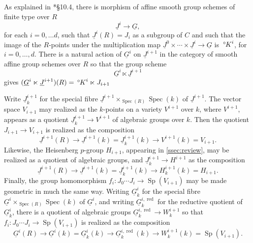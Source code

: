 \documentclass[10pt]{amsart}
\makeatletter
\theoremstyle{plain}
\theoremstyle{definition}
\newcommand{\Fq}{k}
\newcommand{\Spec}[1]{{\operatorname{Spec}(#1)}}
\newcommand{\labitem}[2]{
\def\@itemlabel{\textbf{#1}}
\item
\def\@currentlabel{#1}\label{#2}}
\newcommand{\Sp}{{\operatorname{Sp}}}
\newcommand{\oK}{{\,^\circ \hskip-1pt K}}
\makeatother
\begin{document}
As explained in \cite{Yu:models}*{\S 10.4}, there is morphism of affine smooth group schemes of finite type over $R$ 
\[
\underline{J}^i \to \underline{G},
\] 
for each $i=0,\ldots d$, such that $\underline{J}^i(R) = J_i$ as a subgroup of $C$ and such that the image of the $R$-points under the multiplication map $\underline{J}^0 \times \cdots \times \underline{J}^i \to \underline{G}$ is $\oK^i$, for $i=0, \ldots , d$.
There is a natural action of $\underline{G}^i$ on $\underline{J}^{i+1}$ in the category of smooth affine group schemes over $R$ so that the group scheme
\[
\underline{G}^i \ltimes \underline{J}^{i+1}
\]
gives $(\underline{G}^i \ltimes \underline{J}^{i+1})(R) = \oK^i \ltimes J_{i+1}$

\newcommand{\reductive}{{\operatorname{red}}}

Write $\underline{J}^{i+1}_\Fq$ for the special fibre $\underline{J}^{i+1}\times_{\Spec{R}} \Spec{k}$ of $\underline{J}^{i+1}$. 
The vector space $V_{i+1}$ may realized as the $\Fq$-points on a variety $V^{i+1}$ over $\Fq$, where $V^{i+1}$, appears as a quotient $\underline{J}^{i+1}_{\Fq} \to V^{i+1}$ of algebraic groups over $\Fq$. Then the quotient $J_{i+1} \to V_{i+1}$ is realized as the composition
\[
\underline{J}^{i+1}(R) \to \underline{J}^{i+1}(\Fq) = \underline{J}^{i+1}_\Fq(\Fq) \to V^{i+1}(\Fq) = V_{i+1}.
\]
Likewise, the Heisenberg $p$-group $H_{i+1}$, appearing in \ref{ssec:review}, may be realized as a quotient of algebraic groups, and $\underline{J}^{i+1}_{\Fq} \to H^{i+1}$ as the composition 
\[
\underline{J}^{i+1}(R) \to \underline{J}^{i+1}(\Fq) = \underline{J}^{i+1}_\Fq(\Fq) \to H^{i+1}_{\Fq}(\Fq) = H_{i+1}.
\]
Finally, the group homomorphism $f_i : J_0\cdots J_i \to \Sp(V_{i+1})$ may be made geometric in much the same way. 
Writing $\underline{G}^{i}_\Fq$ for the special fibre $\underline{G}^{i}\times_{\Spec{R}} \Spec{k}$ of $\underline{G}^{i}$, and writing $\underline{G}^{i,\reductive}_\Fq$ for the reductive quotient of $\underline{G}^{i}_\Fq$, there is a quotient of algebraic groups $\underline{G}^{i,\reductive}_\Fq \to W^{i+1}_\Fq$ so that $f_i : J_0\cdots J_i \to \Sp(V_{i+1})$ is realized as the composition
\[
\underline{G}^{i}(R) \to \underline{G}^{i}(\Fq) = \underline{G}^{i}_\Fq(\Fq) \to  \underline{G}^{i,\reductive}_\Fq(\Fq) \to W^{i+1}_{\Fq}(\Fq) = \Sp(V_{i+1}).
\]
\end{document}
